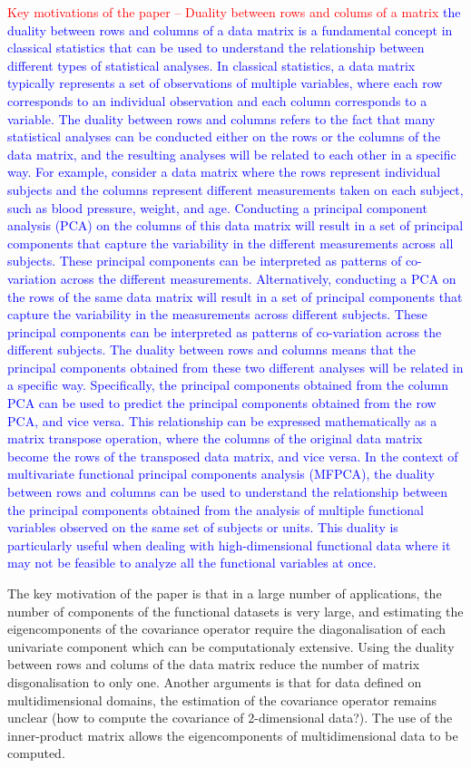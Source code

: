 \textcolor{red}{Key motivations of the paper -- Duality between rows and colums of a matrix}
\textcolor{blue}{the duality between rows and columns of a data matrix is a fundamental concept in classical statistics that can be used to understand the relationship between different types of statistical analyses.
In classical statistics, a data matrix typically represents a set of observations of multiple variables, where each row corresponds to an individual observation and each column corresponds to a variable. The duality between rows and columns refers to the fact that many statistical analyses can be conducted either on the rows or the columns of the data matrix, and the resulting analyses will be related to each other in a specific way.
For example, consider a data matrix where the rows represent individual subjects and the columns represent different measurements taken on each subject, such as blood pressure, weight, and age. Conducting a principal component analysis (PCA) on the columns of this data matrix will result in a set of principal components that capture the variability in the different measurements across all subjects. These principal components can be interpreted as patterns of co-variation across the different measurements.
Alternatively, conducting a PCA on the rows of the same data matrix will result in a set of principal components that capture the variability in the measurements across different subjects. These principal components can be interpreted as patterns of co-variation across the different subjects.
The duality between rows and columns means that the principal components obtained from these two different analyses will be related in a specific way. Specifically, the principal components obtained from the column PCA can be used to predict the principal components obtained from the row PCA, and vice versa. This relationship can be expressed mathematically as a matrix transpose operation, where the columns of the original data matrix become the rows of the transposed data matrix, and vice versa.
In the context of multivariate functional principal components analysis (MFPCA), the duality between rows and columns can be used to understand the relationship between the principal components obtained from the analysis of multiple functional variables observed on the same set of subjects or units. This duality is particularly useful when dealing with high-dimensional functional data where it may not be feasible to analyze all the functional variables at once.}

The key motivation of the paper is that in a large number of applications, the number of components of the functional datasets is very large, and estimating the eigencomponents of the covariance operator require the diagonalisation of each univariate component which can be computationaly extensive. Using the duality between rows and colums of the data matrix reduce the number of matrix disgonalisation to only one. Another arguments is that for data defined on multidimensional domains, the estimation of the covariance operator remains unclear (how to compute the covariance of 2-dimensional data?). The use of the inner-product matrix allows the eigencomponents of multidimensional data to be computed.

